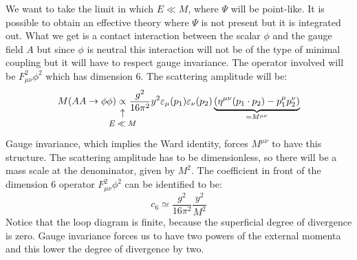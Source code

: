 \documentclass[../main.tex]{subfiles}
\begin{document}
\begin{example}
We want to take the limit in which $E\ll M$, where $\Psi$ will be point-like. It is possible to obtain an effective theory where $\Psi$ is not present but it is integrated out. What we get is a contact interaction between the scalar $\phi$ and the gauge field $A$ but since $\phi$ is neutral this interaction will not be of the type of minimal coupling but it will have to respect gauge invariance. 
The operator involved will be $F^2_{\mu\nu}\phi^2$ which has dimension 6. The scattering amplitude will be:
\[
M(AA\to\phi\phi)\underset{\mathclap{\tikz \node {$\uparrow$} node [below=1ex] {\footnotesize $E\ll M$ };}}{\propto}\frac{g^2}{16\pi^2}y^2\varepsilon_\mu(p_1)\varepsilon_\nu(p_2)\underbrace{(\eta^{\mu\nu}(p_1\cdot p_2)-p_1^\mu p_2^\nu)}_{=M^{\mu\nu}}
\]
Gauge invariance, which implies the Ward identity, forces $M^{\mu\nu}$ to have this structure. The scattering amplitude has to be dimensionless, so there will be a mass scale at the denominator, given by $M^2$. The coefficient in front of the dimension 6 operator $F_{\mu\nu}^2\phi^2$ can be identified to be:
\[
c_6\simeq\frac{g^2}{16\pi^2}\frac{y^2}{M^2}
\]
Notice that the loop diagram is finite, because the superficial degree of divergence is zero. Gauge invariance forces us to have two powers of the external momenta and this lower the degree of divergence by two.
\end{example}
\end{document}
